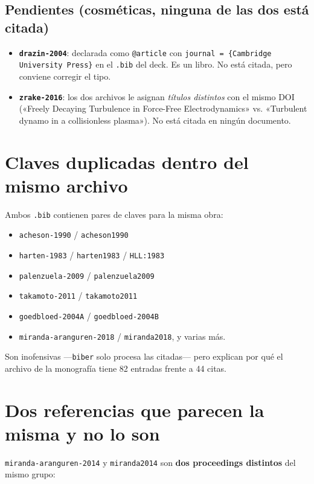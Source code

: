 \documentclass[11pt,openany]{report}
\newcommand{\clave}[1]{\texttt{\small #1}}
\begin{document}
\subsection*{Pendientes (cosméticas, ninguna de las dos está citada)}
\begin{itemize}
  \item \textbf{\clave{drazin-2004}}: declarada como \texttt{@article} con
        \texttt{journal = \{Cambridge University Press\}} en el \texttt{.bib} del deck.
        Es un libro. No está citada, pero conviene corregir el tipo.
  \item \textbf{\clave{zrake-2016}}: los dos archivos le asignan \emph{títulos distintos}
        con el mismo DOI («Freely Decaying Turbulence in Force-Free Electrodynamics» vs.
        «Turbulent dynamo in a collisionless plasma»). No está citada en ningún documento.
\end{itemize}

\section{Claves duplicadas dentro del mismo archivo}

Ambos \texttt{.bib} contienen pares de claves para la misma obra:

\begin{itemize}
  \item \clave{acheson-1990} / \clave{acheson1990}
  \item \clave{harten-1983} / \clave{harten1983} / \clave{HLL:1983}
  \item \clave{palenzuela-2009} / \clave{palenzuela2009}
  \item \clave{takamoto-2011} / \clave{takamoto2011}
  \item \clave{goedbloed-2004A} / \clave{goedbloed-2004B}
  \item \clave{miranda-aranguren-2018} / \clave{miranda2018}, y varias más.
\end{itemize}

Son inofensivas —\texttt{biber} solo procesa las citadas— pero explican
por qué el archivo de la monografía tiene 82 entradas frente a 44 citas.

\section{Dos referencias que parecen la misma y no lo son}

\clave{miranda-aranguren-2014} y \clave{miranda2014} son \textbf{dos
proceedings distintos} del mismo grupo:
\end{document}
